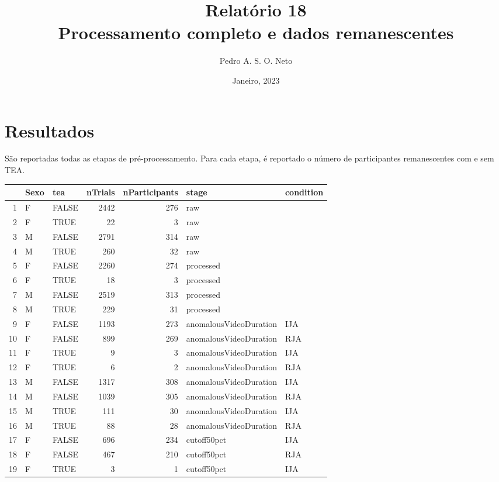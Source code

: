 \documentclass{article}
\title{Relatório 18 \\ Processamento completo e dados remanescentes}
\author{Pedro A. S. O. Neto}
\date{Janeiro, 2023}
\begin{document}
\maketitle

\section{Resultados}

São reportadas todas as etapas de pré-processamento. Para cada etapa, é reportado o número de participantes remanescentes com e sem TEA.

\begin{table}[ht]
\centering
\begin{tabular}{rllrrll}
  \hline
 & Sexo & tea & nTrials & nParticipants & stage & condition \\ 
  \hline
1 & F & FALSE & 2442 & 276 & raw &  \\ 
  2 & F & TRUE &  22 &   3 & raw &  \\ 
  3 & M & FALSE & 2791 & 314 & raw &  \\ 
  4 & M & TRUE & 260 &  32 & raw &  \\ 
  5 & F & FALSE & 2260 & 274 & processed &  \\ 
  6 & F & TRUE &  18 &   3 & processed &  \\ 
  7 & M & FALSE & 2519 & 313 & processed &  \\ 
  8 & M & TRUE & 229 &  31 & processed &  \\ 
  9 & F & FALSE & 1193 & 273 & anomalousVideoDuration & IJA \\ 
  10 & F & FALSE & 899 & 269 & anomalousVideoDuration & RJA \\ 
  11 & F & TRUE &   9 &   3 & anomalousVideoDuration & IJA \\ 
  12 & F & TRUE &   6 &   2 & anomalousVideoDuration & RJA \\ 
  13 & M & FALSE & 1317 & 308 & anomalousVideoDuration & IJA \\ 
  14 & M & FALSE & 1039 & 305 & anomalousVideoDuration & RJA \\ 
  15 & M & TRUE & 111 &  30 & anomalousVideoDuration & IJA \\ 
  16 & M & TRUE &  88 &  28 & anomalousVideoDuration & RJA \\ 
  17 & F & FALSE & 696 & 234 & cutoff50pct & IJA \\ 
  18 & F & FALSE & 467 & 210 & cutoff50pct & RJA \\ 
  19 & F & TRUE &   3 &   1 & cutoff50pct & IJA \\ 

\end{tabular}
\end{table}
\end{document}
